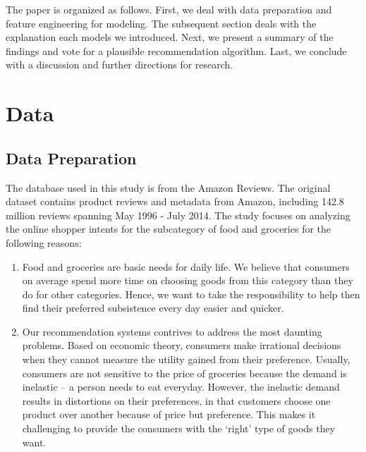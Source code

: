 \documentclass[final, 3p,12pt,times,letter,twocolumn]{elsarticle}
\begin{document}
\nohyphens{
The paper is organized as follows. First, we deal with data preparation and feature engineering for modeling. The subsequent section deals with the explanation each models we introduced. Next, we present a summary of the findings and vote for a plausible recommendation algorithm. Last, we conclude with a discussion and further directions for research.
}

\section{Data}

\subsection{Data Preparation}

The database used in this study is from the Amazon Reviews. The original dataset contains product reviews and metadata from Amazon, including 142.8 million reviews spanning May 1996 - July 2014. The study focuses on analyzing the online shopper intents for the subcategory of food and groceries for the following reasons:
\begin{enumerate}[(1)]
\item Food and groceries are basic needs for daily life. We believe that consumers on average spend more time on choosing goods from this category than they do for other categories. Hence, we want to take the responsibility to help then find their preferred subsistence every day easier and quicker.
\item Our recommendation systems contrives to address the most daunting problems. Based on economic theory, consumers make irrational decisions when they cannot measure the utility gained from their preference. Usually, consumers are not sensitive to the price of groceries because the demand is inelastic -- a person needs to eat everyday. However, the inelastic demand results in distortions on their preferences, in that customers choose one product over another because of price but preference. This makes it challenging to provide the consumers with the `right' type of goods they want.

\end{enumerate}
\end{document}
